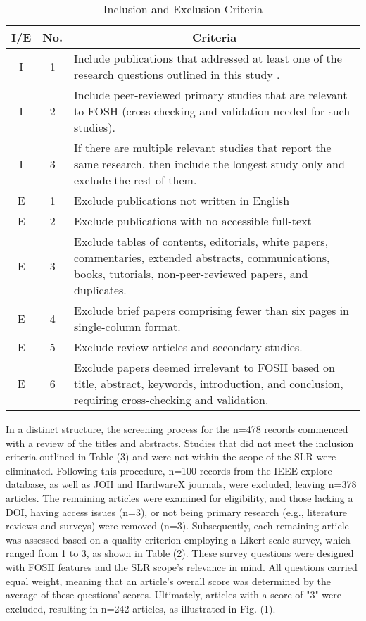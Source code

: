 \begin{table}[htbp]
\centering
\caption{Inclusion and Exclusion Criteria}
\begin{tabular}{|c|c|p{6.5cm}|}
\hline
\textbf{I/E} & \textbf{No.} & \multicolumn{1}{c|}{\textbf{Criteria}} \\
\hline
I & 1 & Include publications that addressed at least one of the research questions outlined in this study . \\
\hline
I & 2 & Include peer-reviewed primary studies that are relevant to FOSH (cross-checking and validation needed for such studies). \\
\hline
I & 3 & If there are multiple relevant studies that report the same research, then include the longest study only and exclude the rest of them. \\
\hline
E & 1 & Exclude publications not written in English \\
\hline
E & 2 & Exclude publications with no accessible full-text\\
\hline
E & 3 & Exclude tables of contents, editorials, white papers, commentaries, extended abstracts, communications, books, tutorials, non-peer-reviewed papers, and duplicates. \\
\hline
E & 4 & Exclude brief papers comprising fewer than six pages in single-column format. \\
\hline
E & 5 & Exclude review articles and secondary studies. \\
\hline
E & 6 & Exclude papers deemed irrelevant to FOSH based on title, abstract, keywords, introduction, and conclusion, requiring cross-checking and validation. \\
\hline
\end{tabular}
\label{tab:criteria}
\end{table}

In a distinct structure, the screening process for the n=478 records commenced with a review of the titles and abstracts. Studies that did not meet the inclusion criteria outlined in Table (3) and were not within the scope of the SLR were eliminated. Following this procedure, n=100 records from the IEEE explore database, as well as JOH and HardwareX journals, were excluded, leaving n=378 articles. The remaining articles were examined for eligibility, and those lacking a DOI, having access issues (n=3), or not being primary research (e.g., literature reviews and surveys) were removed (n=3). Subsequently, each remaining article was assessed based on a quality criterion employing a Likert scale survey, which ranged from 1 to 3, as shown in Table (2). These survey questions were designed with FOSH features and the SLR scope's relevance in mind. All questions carried equal weight, meaning that an article's overall score was determined by the average of these questions' scores. Ultimately, articles with a score of "3" were excluded, resulting in n=242 articles, as illustrated in Fig. (1).

